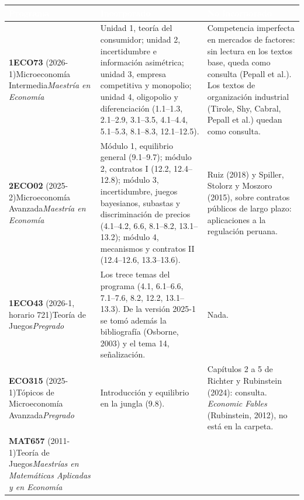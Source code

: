 \documentclass[11pt,a4paper]{article}
\newcommand{\cab}[1]{\textcolor{white}{\sffamily\bfseries #1}}
\newcommand{\filasalternas}{\rowcolors{2}{white}{tonoPalido}}
\begin{document}
\medskip
{\small\filasalternas
\noindent\begin{tabularx}{\textwidth}{>{\raggedright\arraybackslash}p{3.1cm}>{\raggedright\arraybackslash}X>{\raggedright\arraybackslash}X}
\toprule
\rowcolor{tonoOscuro}\cab{Programa} & \cab{Incorporado} & \cab{No incorporado} \\
\midrule
\textbf{1ECO73} (2026-1)\newline Microeconomía Intermedia\newline\emph{Maestría en Economía}
 & Unidad 1, teoría del consumidor; unidad 2, incertidumbre e información asimétrica; unidad 3, empresa competitiva y monopolio; unidad 4, oligopolio y diferenciación (1.1--1.3, 2.1--2.9, 3.1--3.5, 4.1--4.4, 5.1--5.3, 8.1--8.3, 12.1--12.5).
 & Competencia imperfecta en mercados de factores: sin lectura en los textos base, queda como consulta (Pepall et al.). Los textos de organización industrial (Tirole, Shy, Cabral, Pepall et al.) quedan como consulta. \\[3pt]
\textbf{2ECO02} (2025-2)\newline Microeconomía Avanzada\newline\emph{Maestría en Economía}
 & Módulo 1, equilibrio general (9.1--9.7); módulo 2, contratos I (12.2, 12.4--12.8); módulo 3, incertidumbre, juegos bayesianos, subastas y discriminación de precios (4.1--4.2, 6.6, 8.1--8.2, 13.1--13.2); módulo 4, mecanismos y contratos II (12.4--12.6, 13.3--13.6).
 & Ruiz (2018) y Spiller, Stolorz y Moszoro (2015), sobre contratos públicos de largo plazo: aplicaciones a la regulación peruana. \\[3pt]
\textbf{1ECO43} (2026-1, horario 721)\newline Teoría de Juegos\newline\emph{Pregrado}
 & Los trece temas del programa (4.1, 6.1--6.6, 7.1--7.6, 8.2, 12.2, 13.1--13.3). De la versión 2025-1 se tomó además la bibliografía (Osborne, 2003) y el tema 14, señalización.
 & Nada. \\[3pt]
\textbf{ECO315} (2025-1)\newline Tópicos de Microeconomía Avanzada\newline\emph{Pregrado}
 & Introducción y equilibrio en la jungla (9.8).
 & Capítulos 2 a 5 de Richter y Rubinstein (2024): consulta. \emph{Economic Fables} (Rubinstein, 2012), no está en la carpeta. \\[3pt]
\textbf{MAT657} (2011-1)\newline Teoría de Juegos\newline\emph{Maestrías en Matemáticas Aplicadas y en Economía}

\end{tabularx}}
\end{document}
